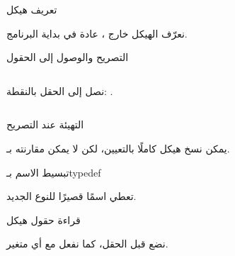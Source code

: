 \documentclass[aspectratio=169, 11pt, t, xcolor={table}]{beamer}
\begin{document}
\begin{frame}{تعريف هيكل}
    \begin{center}
    \begin{minipage}{0.72\textwidth}
    \end{minipage}
    \end{center}
    \vspace{0.3cm}
    نعرّف الهيكل خارج ، عادة في بداية البرنامج.
\end{frame}

\begin{frame}[t]{التصريح والوصول إلى الحقول}
    \begin{columns}[T]
        {\small نصل إلى الحقل بالنقطة: .\par}
        \vspace{0.3cm}
    \end{columns}
\end{frame}

\begin{frame}{التهيئة عند التصريح}
    \begin{center}
    \begin{minipage}{0.72\textwidth}
    \end{minipage}
    \end{center}
    \vspace{0.3cm}
    يمكن نسخ هيكل كاملًا بالتعيين، لكن لا يمكن مقارنته بـ\code{==}.
\end{frame}

\begin{frame}{تبسيط الاسم بـ\textenglish{typedef}}
    \begin{center}
    \begin{minipage}{0.72\textwidth}
    \end{minipage}
    \end{center}
    \vspace{0.3cm}
     تعطي اسمًا قصيرًا للنوع الجديد.
\end{frame}

\begin{frame}{قراءة حقول هيكل}
    \begin{center}
    \begin{minipage}{0.72\textwidth}
    \end{minipage}
    \end{center}
    \vspace{0.3cm}
    نضع \code{\&} قبل الحقل، كما نفعل مع أي متغير.
\end{frame}
\end{document}
